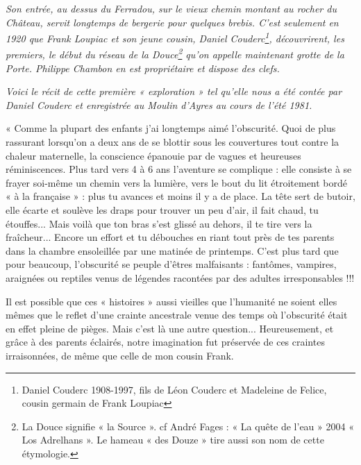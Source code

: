 



\vspace{1.5em}

\textit{Son entrée, au dessus du Ferradou, sur le vieux chemin montant au rocher du Château, servit
longtemps de bergerie pour quelques brebis. C’est seulement en 1920 que Frank Loupiac et
son jeune cousin, Daniel Couderc\footnote{Daniel Couderc 1908-1997, fils de Léon Couderc et Madeleine de Felice, cousin germain de Frank Loupiac}, découvrirent, les premiers, le début du réseau de la
Douce\footnote{La Douce signifie « la Source ». cf André Fages : « La quête de l’eau » 2004 «
Los Adrelhans ». Le hameau « des Douze » tire aussi son nom de cette étymologie.} qu’on appelle maintenant grotte de la Porte. Philippe Chambon en est propriétaire et dispose des clefs.}

\textit{Voici le récit de cette première « exploration » tel qu’elle nous a été contée par Daniel
Couderc et enregistrée au Moulin d’Ayres au cours de l’été 1981.}

\vspace{1em}

« Comme la plupart des enfants j’ai longtemps aimé l’obscurité. Quoi de plus rassurant
lorsqu’on a deux ans de se blottir sous les couvertures tout contre la chaleur maternelle, la
conscience épanouie par de vagues et heureuses réminiscences. Plus tard vers 4 à 6
ans l’aventure se complique : elle consiste à se frayer soi-même un chemin vers la lumière,
vers le bout du lit étroitement bordé « à la française » : plus tu avances et moins il y a de
place. La tête sert de butoir, elle écarte et soulève les draps pour trouver un peu d’air, il fait
chaud, tu étouffes... Mais voilà que ton bras s’est glissé au dehors, il te tire vers la fraîcheur...
Encore un effort et tu débouches en riant tout près de tes parents dans la chambre ensoleillée
par une matinée de printemps. C’est plus tard que pour beaucoup, l’obscurité se peuple d’êtres
malfaisants : fantômes, vampires, araignées ou reptiles venus de légendes racontées par des
adultes irresponsables !!!

Il est possible que ces « histoires » aussi vieilles que l’humanité ne soient elles mêmes que le
reflet d’une crainte ancestrale venue des temps où l’obscurité était en effet pleine de pièges.
Mais c’est là une autre question...
Heureusement, et grâce à des parents éclairés, notre imagination fut préservée de ces craintes
irraisonnées, de même que celle de mon cousin Frank.

